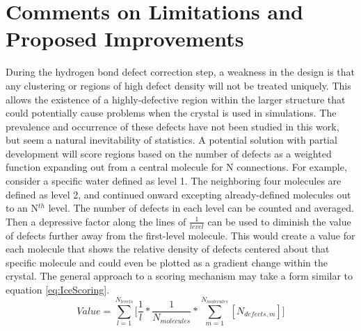 \section{Comments on Limitations and Proposed Improvements}

During the hydrogen bond defect correction step, a weakness in the design is that any clustering or regions of high defect density will not be treated uniquely.
This allows the existence of a highly-defective region within the larger structure that could potentially cause problems when the crystal is used in simulations. 
The prevalence and occurrence of these defects have not been studied in this work, but seem a natural inevitability of statistics. 
A potential solution with partial development will score regions based on the number of defects as a weighted function expanding out from a central molecule for N connections. 
For example, consider a specific water defined as level 1. 
The neighboring four molecules are defined as level 2, and continued onward excepting already-defined molecules out to an N$^{th}$ level. 
The number of defects in each level can be counted and averaged.
Then a depressive factor along the lines of $\frac{1}{level}$ can be used to diminish the value of defects further away from the first-level molecule.
This would create a value for each molecule that shows the relative density of defects centered about that specific molecule and could even be plotted as a gradient change within the crystal.
The general approach to a scoring mechanism may take a form similar to equation \ref{eq:IceScoring}.
\begin{equation}
\label{eq:IceScoring}
Value = \sum_{l=1}^{N_{levels}} \Big[\frac{1}{l} * \frac{1} {N_{molecules}} *\sum_{m=1}^{N_{molecules}}[N_{defects, m}]\Big]
\end{equation}





